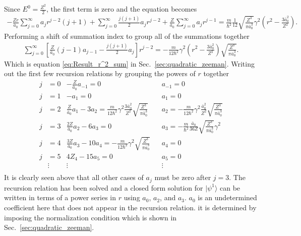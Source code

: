     \noindent Since $E^0 = \frac{Z^2}{2}$, the first term is zero and the equation becomes 
    \begin{align*}
        -\frac{Zr}{\bar{a}_0} \sum_{j = 0}^\infty a_j r^{j - 2} (j + 1) + \sum_{j = 0}^\infty \frac{j(j+1)}{2} a_j r^{j - 2} + \frac{Z}{\bar{a}_0} \sum_{j = 0}^\infty a_j r^{j-1} = \frac{m}{\hbar^2}\frac{1}{12}\sqrt{\frac{Z^3}{\pi \bar{a}_0^3}} \gamma^2 \left(r^2 - \frac{3\bar{a}_0^2}{Z^2} \right).
    \end{align*}
    \noindent Performing a shift of summation index to group all of the summations together 
    \begin{align}
        \sum_{j = 0}^\infty \left[ \frac{Z}{\bar{a}_0}(j-1) a_{j-1} - \frac{j(j+1)}{2} a_j \right] r^{j-2} = -\frac{m}{12 \hbar^2} \gamma^2 \left(r^2 - \frac{3\bar{a}_0^2}{Z^2} \right) \sqrt{\frac{Z^3}{\pi \bar{a}_0^3}}.
    \end{align}
    \noindent Which is equation \eqref{eq:Result_r^2_sum} in Sec.~\ref{sec:quadratic_zeeman}. Writing out the first few recursion relations by grouping the powers of $r$ together 
    \begin{align*}
        j &= 0 & -\frac{Z}{\bar{a}_0}a_{-1} = 0& &a_{-1} = 0\\ \nonumber
        j &= 1 & -a_1 = 0& &a_{1} = 0\\ \nonumber
        j &= 2 & \frac{Z}{\bar{a}_0} a_1 - 3a_2 = \frac{m}{12 \hbar^2} \gamma^2 \frac{3\bar{a}_0^2}{Z^2}\sqrt{\frac{Z^3}{\pi \bar{a}_0^3}} & &a_2 = -\frac{m}{12 \hbar^2} \gamma^2 \frac{\bar{a}_0^2}{Z^2}\sqrt{\frac{Z^3}{\pi \bar{a}_0^3}}\\ \nonumber
        j &= 3 & \frac{2Z}{\bar{a}_0}a_2 - 6a_3 = 0&& a_3 = -\frac{m}{\hbar^2}\frac{\bar{a}_0}{36Z}\sqrt{\frac{Z^3}{\pi \bar{a}_0^3}} \gamma^2\\ \nonumber
        j &= 4 & \frac{3Z}{\bar{a}_0}a_3 - 10a_4 = -\frac{m}{12 \hbar^2} \gamma^2 \sqrt{\frac{Z^3}{\pi \bar{a}_0^3}} && a_4 = 0\\ \nonumber
        j &= 5 & 4Z_4 - 15a_5 = 0 && a_5 = 0 \\ \nonumber
        & \vdots & \vdots && \vdots \\
    \end{align*}
    \noindent It is clearly seen above that all other cases of $a_j$ must be zero after $j = 3$. The recursion relation has been solved and a closed form solution for $\vert \psi^1 \rangle$ can be written in terms of a power series in $r$ using $a_0$, $a_2$, and $a_3$. $a_0$ is an undetermined coefficient here that does not appear in the recursion relation. it is determined by imposing the normalization condition which is shown in Sec.~\ref{sec:quadratic_zeeman}.\\


